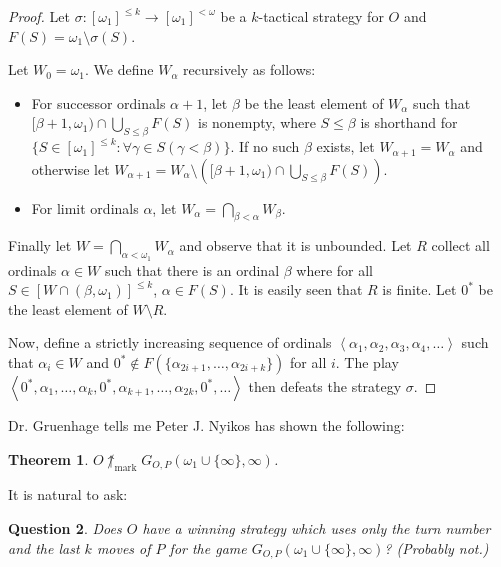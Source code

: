 \documentclass[11pt]{article}
\theoremstyle{plain}
\newtheorem{theorem}{Theorem}
\newtheorem{question}[theorem]{Question}
\theoremstyle{definition}
\theoremstyle{remark}
\newcommand{\markwin}{\uparrow_{\text{mark}}}
\begin{document}
\begin{proof}
Let $\sigma:[\omega_1]^{\leq k}\to[\omega_1]^{<\omega}$ be a $k$-tactical strategy for $O$ and $F(S)=\omega_1\setminus\sigma(S)$.

Let $W_0=\omega_1$. We define $W_\alpha$ recursively as follows:
    \begin{itemize}
    \item For successor ordinals $\alpha+1$, let $\beta$ be the least element of $W_\alpha$ such that $[\beta+1,\omega_1) \cap \bigcup_{S\leq \beta} F(S)$ is nonempty, where $S \leq \beta$ is shorthand for $\{S \in [\omega_1]^{\leq k} : \forall \gamma \in S(\gamma < \beta)\}$. If no such $\beta$ exists, let $W_{\alpha+1}=W_\alpha$ and otherwise let $W_{\alpha+1}=W_\alpha \setminus \left([\beta+1,\omega_1) \cap \bigcup_{S\leq \beta} F(S)\right)$.
    \item For limit ordinals $\alpha$, let $W_\alpha = \bigcap_{\beta<\alpha} W_\beta$.
    \end{itemize}

Finally let $W=\bigcap_{\alpha<\omega_1}W_\alpha$ and observe that it is unbounded. Let $R$ collect all ordinals $\alpha\in W$ such that there is an ordinal $\beta$ where for all $S\in[W\cap(\beta,\omega_1)]^{\leq k}$, $\alpha \in F(S)$. It is easily seen that $R$ is finite. Let $0^*$ be the least element of $W\setminus R$.

Now, define a strictly increasing sequence of ordinals $\left<\alpha_1,\alpha_2,\alpha_3,\alpha_4,\dots\right>$ such that $\alpha_i \in W$ and $0^* \not\in F(\{\alpha_{2i+1},\dots,\alpha_{2i+k}\})$ for all $i$. The play $\left<0^*,\alpha_1,\dots,\alpha_k,0^*,\alpha_{k+1},\dots,\alpha_{2k},0^*,\dots\right>$ then defeats the strategy $\sigma$.
\end{proof}

Dr. Gruenhage tells me Peter J. Nyikos has shown the following:

\begin{theorem}
$O\not\markwin G_{O,P}(\omega_1\cup\{\infty\},\infty)$.
\end{theorem}

It is natural to ask:

\begin{question}
Does $O$ have a winning strategy which uses only the turn number and the last $k$ moves of $P$ for the game $G_{O,P}(\omega_1\cup\{\infty\},\infty)$? (Probably not.)
\end{question}
\end{document}
